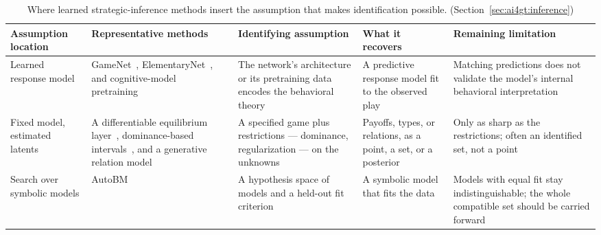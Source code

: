 \begin{table}[pos=t]
\centering
\caption{Where learned strategic-inference methods insert the assumption that makes
identification possible. (Section~\ref{sec:ai4gt:inference})}
\label{tab:inference_methods}
\footnotesize
\setlength{\tabcolsep}{3.5pt}
\renewcommand{\arraystretch}{1.25}

\begin{tabularx}{\textwidth}{
    >{\raggedright\arraybackslash}p{}
    >{\raggedright\arraybackslash}p{}
    Y
    Y
    Y
}
\toprule
\textbf{Assumption location}
& \textbf{Representative methods}
& \textbf{Identifying assumption}
& \textbf{What it recovers}
& \textbf{Remaining limitation}
\\
\midrule

Learned response model
& GameNet~\citep{Hartford2016}, ElementaryNet~\citep{DEon2026ElementaryNet}, and
cognitive-model pretraining~\citep{Bourgin2019}
& The network's architecture or its pretraining data encodes the behavioral theory
& A predictive response model fit to the observed play
& Matching predictions does not validate the model's internal behavioral
interpretation
\\

\addlinespace

Fixed model, estimated latents
& A differentiable equilibrium layer~\citep{Ling2018}, dominance-based
intervals~\citep{CuiYu2023}, and a generative relation model~\citep{Shum2019}
& A specified game plus restrictions --- dominance, regularization --- on the unknowns
& Payoffs, types, or relations, as a point, a set, or a posterior
& Only as sharp as the restrictions; often an identified set, not a point
\\

\addlinespace

Search over symbolic models
& AutoBM~\citep{AutoBM2026}
& A hypothesis space of models and a held-out fit criterion
& A symbolic model that fits the data
& Models with equal fit stay indistinguishable; the whole compatible set should be
carried forward
\\

\bottomrule
\end{tabularx}
\end{table}

